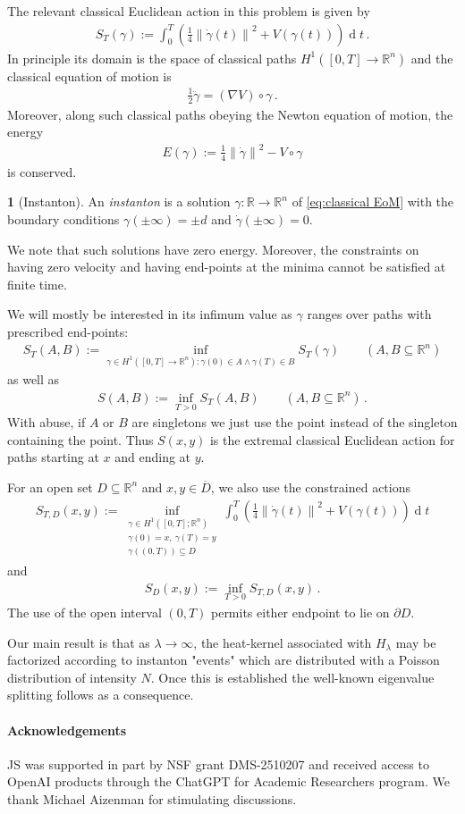\documentclass[a4paper,10pt]{article}
\numberwithin{equation}{section}
\theoremstyle{plain}
\theoremstyle{plain}
\theoremstyle{plain}
\theoremstyle{plain}
\theoremstyle{plain}
\theoremstyle{remark}
\theoremstyle{definition}
\newtheorem{defn}[thm]{\protect\definitionname}
\providecommand{\definitionname}{Definition}
\newcommand{\RR}{\mathbb{R}}
\newcommand\norm[1]{\left\lVert#1\right\rVert}
\newcommand{\dif}{\operatorname{d}\!} %
\newcommand{\eq}[1]{\begin{align*}#1\end{align*}}
\newcommand{\eql}[1]{\begin{align}#1\end{align}}
\newcommand{\br}[1]{\left(#1\right)}
\begin{document}
The relevant classical Euclidean action in this problem is given by \eql{\label{eq:classical Euclidean action}
S_T(\gamma) := \int_0^T\br{\frac{1}{4}\norm{\dot{\gamma}(t)}^2 + V\br{\gamma(t)}}\dif{t}\,.
} In principle its domain is the space of classical paths $ H^{1}\left(\left[0,T\right]\to\mathbb{R}^{n}\right)$ and the classical equation of motion is \eql{\label{eq:classical EoM}
\frac12 \ddot{\gamma} = \br{\nabla V }\circ\gamma\,.
} Moreover, along such classical paths obeying the Newton equation of motion, the energy
\eq{
E(\gamma) := \frac14 \norm{\dot{\gamma}}^2 - V\circ\gamma
} is conserved. 
\begin{defn}[Instanton] An \emph{instanton} is a solution $\gamma:\RR\to\RR^n$ of \cref{eq:classical EoM} with the boundary conditions $\gamma(\pm\infty)=\pm d$ and $\dot{\gamma}(\pm\infty)=0$. 
\end{defn}
We note that such solutions have zero energy. Moreover, the constraints on having zero velocity and having end-points at the minima cannot be satisfied at finite time.

We will mostly be interested in its infimum value as $\gamma$ ranges over paths with prescribed end-points: 
\eql{
S_T(A,B) := \inf_{\gamma\in H^{1}\left(\left[0,T\right]\to\mathbb{R}^{n}\right):\gamma(0) \in A\land \gamma(T) \in B}S_T(\gamma)\qquad(A,B\subseteq \RR^n)
} as well as 
\eql{
S(A,B) := \inf_{T>0} S_T(A,B)\qquad(A,B\subseteq \RR^n)\,.
} With abuse, if $A$ or $B$ are singletons we just use the point instead of the singleton containing the point. Thus $S(x,y)$ is the extremal classical Euclidean action for paths starting at $x$ and ending at $y$.

For an open set $D\subseteq\RR^n$ and $x,y\in\overline D$, we also use the constrained actions
\eql{
S_{T,D}(x,y)
:=
\inf_{\substack{
\gamma\in H^1([0,T];\RR^n)\\
\gamma(0)=x,\ \gamma(T)=y\\
\gamma((0,T))\subseteq D
}}
\int_0^T
\left(
\frac14\norm{\dot\gamma(t)}^2+V\br{\gamma(t)}
\right)\dif{t}
}
and
\eql{
S_D(x,y):=\inf_{T>0}S_{T,D}(x,y)\,.
}
The use of the open interval $(0,T)$ permits either endpoint to lie on
$\partial D$.

Our main result is that as $\lambda\to\infty$, the heat-kernel associated with $H_\lambda$ may be factorized according to instanton "events" which are distributed with a Poisson distribution of intensity $N$. Once this is established the well-known eigenvalue splitting follows as a consequence. 

\paragraph{Acknowledgements}
JS was supported in part by NSF grant DMS-2510207 and received access to OpenAI products through the ChatGPT for Academic Researchers program. We thank Michael Aizenman for stimulating discussions.
\end{document}
